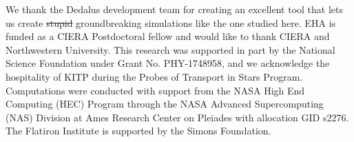 \documentclass[onecolumn, twocolappendix]{aastex631}
\begin{document}






\begin{acknowledgments}
    We thank the Dedalus development team for creating an excellent tool that lets us create \sout{stupid} groundbreaking simulations like the one studied here.
EHA is funded as a CIERA Postdoctoral fellow and would like to thank CIERA and Northwestern University. 
This research was supported in part by the National Science Foundation under Grant No. PHY-1748958, and we acknowledge the hospitality of KITP during the Probes of Transport in Stars Program.
Computations were conducted with support from the NASA High End Computing (HEC) Program through the NASA Advanced Supercomputing (NAS) Division at Ames Research Center on Pleiades with allocation GID s2276.
The Flatiron Institute is supported by the Simons Foundation.
\end{acknowledgments}

\appendix







\newpage


\end{document}
